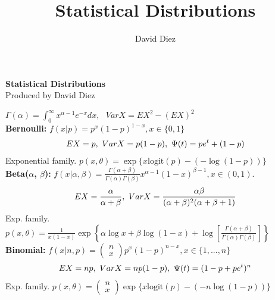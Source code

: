 \documentclass[11pt]{article}
\title{Statistical Distributions}
\author{David Diez}
\begin{document}
\pagestyle{empty}

\begin{center}\Large\textbf{Statistical Distributions}\normalsize \\
Produced by David Diez\end{center} \footnotesize
\indent\indent\indent\indent\indent\indent\indent\indent\indent$\Gamma(\alpha) = \int_{0}^{\infty}{x^{\alpha-1}e^{-x}dx},\text{ }VarX = EX^2 - (EX)^2$\\ 

\noindent\textbf{Bernoulli:} $f(x|p) = p^x(1-p)^{1-x},x \in \{0,1\}$
\begin{eqnarray}
EX = p,\text{ }VarX = p(1-p), \text{ }\Psi(t) = pe^t + (1-p) \notag
\end{eqnarray}
\indent Exponential family. $p(x,\theta) = \exp{\{ x\text{logit}(p) - (-\log{(1-p)}) \}}$ \\

\noindent\textbf{Beta($\alpha$, $\beta$):} $f(x|\alpha,\beta) = \frac{\Gamma(\alpha+\beta)}{\Gamma(\alpha)\Gamma(\beta)}x^{\alpha-1}(1-x)^{\beta-1},x \in (0,1)$.
\begin{eqnarray}
EX = \frac{\alpha}{\alpha+\beta},\text{ }VarX = \frac{\alpha\beta}{(\alpha+\beta)^2(\alpha+\beta+1)} \notag
\end{eqnarray}
\indent Exp. family. $p(x,\theta) = \frac{1}{x(1-x)}\exp{\left\{ \alpha\log{x} + \beta\log{(1-x)} + \log{\left[\frac{\Gamma(\alpha+\beta)}{\Gamma(\alpha)\Gamma(\beta)}\right]} \right\}}$ \\

\noindent\textbf{Binomial:} $f(x|n,p) =$\scriptsize$\left(\begin{array}{c}n \\ x \end{array}\right)$\normalsize $p^x(1-p)^{n-x},x \in \{1,...,n\}$
\begin{eqnarray}
EX = np,\text{ }VarX = np(1-p),\text{ }\Psi(t) = (1-p+pe^t)^n \notag
\end{eqnarray}
\indent Exp. family. $p(x,\theta) = $\scriptsize$\left(\begin{array}{c}n \\ x \end{array}\right)$\footnotesize $\exp{\{ x\text{logit}(p) - (-n\log{(1-p)}) \}}$ \\
\end{document}
